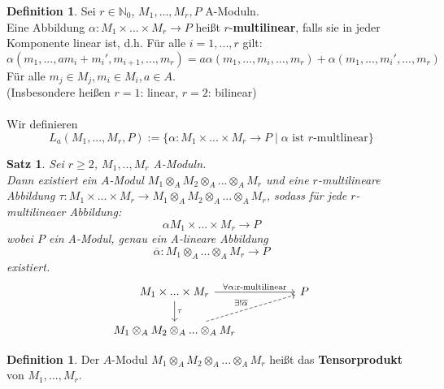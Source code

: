 \documentclass[10pt,a4paper]{article}
\newcommand{\N}{\ensuremath{\mathbb{N}}}
\newcommand{\al}{\ensuremath{\alpha}}
\newcommand{\ol}[1]{\overline{#1}}
\newcounter{thm}[section]
\theoremstyle{definition}
\newtheorem{definition}[thm]{Definition}
\theoremstyle{plain}
\newtheorem{satz}[thm]{Satz}
\theoremstyle{remark}
\begin{document}
\begin{definition}
	Sei $r\in \N_0$, $M_1,...,M_r,P$ A-Moduln.\\
	Eine Abbildung $\al:M_1\times...\times M_r\rightarrow P$ heißt $r$-\textbf{multilinear}, falls sie in jeder Komponente linear ist, d.h. Für alle $i=1,...,r$ gilt:
	\[\al(m_1,...,am_{i}+m_i',m_{i+1},...,m_r)=a\al(m_1,...,m_i,...,m_r)+\al(m_1,...,m_i',...,m_r)\]
	Für alle $m_j\in M_j,m_i\in M_i,a\in A$.\\
	(Insbesondere heißen $r=1$: linear, $r=2$: bilinear)\\
	\\
	Wir definieren
	\[L_a(M_1,...,M_r,P):=\{\al:M_1\times...\times M_r\rightarrow P\mid\text{$\al$ ist $r$-multlinear}\}\]
\end{definition}

\setcounter{thm}{2}


\begin{satz}
	Sei $r\ge 2$, $M_1,..,M_r$ A-Moduln.\\
	Dann existiert ein $A$-Modul $M_1\otimes_AM_2\otimes_A...\otimes_AM_r$ und eine $r$-multilineare Abbildung $\tau:M_1\times...\times M_r\rightarrow M_1\otimes_AM_2\otimes_A...\otimes_AM_r$, sodass für jede $r$-multilineaer Abbildung:
	\[\al M_1\times...\times M_r\rightarrow P\]
	wobei $P$ ein A-Modul, genau ein A-lineare Abbildung 
	\[\ol\al:M_1\otimes_A...\otimes_AM_r\rightarrow P\]
	existiert.
	\[
	\begin{tikzcd}
		M_1\times...\times M_r \arrow{rr}{\forall\al:\text{r-multilinear}} \arrow{d}{\tau} && P\\
		M_1\otimes_AM_2\otimes_A...\otimes_A M_r \arrow[urr,dashed,"\exists!\ol \al"] &
	\end{tikzcd}
	\]
\end{satz}

\addtocounter{thm}{-1}
\begin{definition}
	Der $A$-Modul $M_1\otimes_AM_2\otimes_A...\otimes_AM_r$ heißt das \textbf{Tensorprodukt} von $M_1,...,M_r$.
\end{definition}
\end{document}
